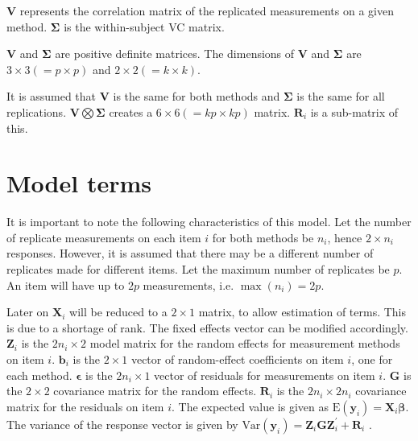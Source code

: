 \documentclass[12pt, a4paper]{report}
\theoremstyle{plain}
\theoremstyle{definition}
\theoremstyle{remark}
\begin{document}
$\boldsymbol{V}$ represents the correlation matrix of the replicated measurements on a given method.
		$\boldsymbol{\Sigma}$ is the within-subject VC matrix.
		
$\boldsymbol{V}$ and $\boldsymbol{\Sigma}$ are positive
		definite matrices. The dimensions of $\boldsymbol{V}$ and
		$\boldsymbol{\Sigma}$ are $3 \times 3 ( = p \times p )$ and $ 2 \times
		2 (= k \times k)$.
		
It is assumed that $\boldsymbol{V}$ is the same for both methods and $\boldsymbol{\Sigma}$ is
		the same for all replications.
$\boldsymbol{V} \bigotimes \boldsymbol{\Sigma}$ creates a $ 6 \times 6 ( = kp \times
		kp)$ matrix.
		$\boldsymbol{R}_{i}$ is a sub-matrix of this.

\section{Model terms}
It is important to note the following characteristics of this model.
Let the number of replicate measurements on each item $i$ for both methods be $n_i$, hence $2 \times n_i$ responses. However, it is assumed that there may be a different number of replicates made for different items. Let the maximum number of replicates be $p$. An item will have up to $2p$ measurements, i.e. $\max(n_{i}) = 2p$.
		
Later on $\boldsymbol{X}_i$ will be reduced to a $2 \times 1$ matrix, to allow estimation of terms. This is due to a shortage of rank. The fixed effects vector can be modified accordingly.
 $\boldsymbol{Z}_i$ is the $2n_i \times  2$ model matrix for the random effects for measurement methods on item $i$.
 $\boldsymbol{b}_i$ is the $2 \times  1$ vector of random-effect coefficients on item $i$, one for each method.
 $\boldsymbol{\epsilon}$  is the $2n_i \times  1$ vector of residuals for measurements on item $i$.
 $\boldsymbol{G}$ is the $2 \times  2$ covariance matrix for the random effects.
 $\boldsymbol{R}_i$ is the $2n_i \times  2n_i$ covariance matrix for the residuals on item $i$.
The expected value is given as $\mbox{E}(\boldsymbol{y}_i) = \boldsymbol{X}_i\boldsymbol{\beta}.$ \citep{hamlett}
 The variance of the response vector is given by $\mbox{Var}(\boldsymbol{y}_i)  = \boldsymbol{Z}_i \boldsymbol{G} \boldsymbol{Z}_i^{\prime} + \boldsymbol{R}_i$ \citep{hamlett}.
\end{document}
